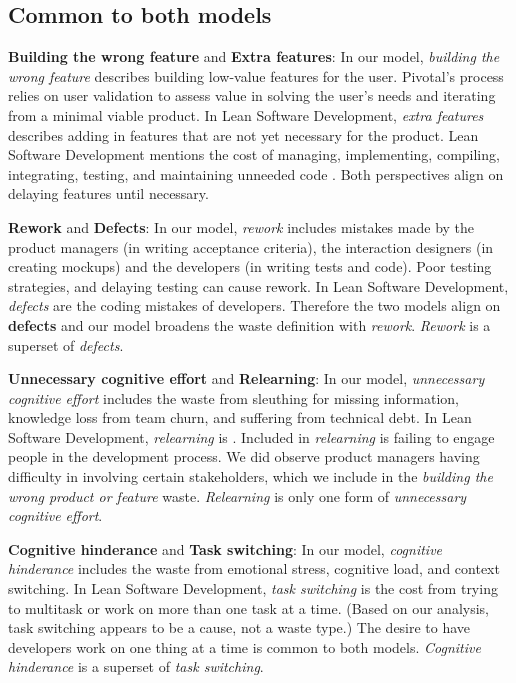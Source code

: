 \subsection{Common to both models}
\textbf{Building the wrong feature} and \textbf{Extra features}: In our model, \textit{building the wrong feature} describes building low-value features for the user. Pivotal's process relies on user validation to assess value in solving the user's needs and iterating from a minimal viable product. In Lean Software Development, \textit{extra features} describes adding in features that are not yet necessary for the product. Lean Software Development mentions the cost of managing, implementing, compiling, integrating, testing, and maintaining unneeded code \cite{PoppendieckLeanSoftwareDevelopment}.  Both perspectives align on delaying features until necessary. 


\textbf{Rework} and \textbf{Defects}: In our model, \textit{rework} includes mistakes made by the product managers (in writing acceptance criteria), the interaction designers (in creating mockups) and the developers (in writing tests and code). Poor testing strategies, and delaying testing can cause rework. In Lean Software Development, \textit{defects} are the coding mistakes of developers. Therefore the two models align on \textbf{defects} and our model broadens the waste definition with \textit{rework}. \textit{Rework} is a superset of \textit{defects}. 

\textbf{Unnecessary cognitive effort} and \textbf{Relearning}: In our model, \textit{unnecessary cognitive effort} includes the waste from sleuthing for missing information, knowledge loss from team churn, and suffering from technical debt. In Lean Software Development, \textit{relearning} is  \cite{PoppendieckConceptToCash}. Included in \textit{relearning} is failing to engage people in the development process. We did observe product managers having difficulty in involving certain stakeholders, which we include in the \textit{building the wrong product or feature} waste. \textit{Relearning} is only one form of \textit{unnecessary cognitive effort}.


\textbf{Cognitive hinderance} and \textbf{Task switching}: In our model, \textit{cognitive hinderance} includes the waste from emotional stress, cognitive load, and context switching. In Lean Software Development, \textit{task switching} is the cost from trying to multitask or work on more than one task at a time. (Based on our analysis, task switching appears to be a cause, not a waste type.) The desire to have developers work on one thing at a time is common to both models. \textit{Cognitive hinderance} is a superset of \textit{task switching}.  

